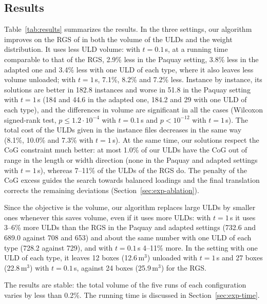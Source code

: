 \subsection{Results}
\label{sec:exp-results}

Table~\ref{tab:results} summarizes the results. In the three settings, our algorithm improves on
the RGS of \citet{Hessler2025} in both the volume of the ULDs and the weight distribution. It uses
less ULD volume: with $t = 0.1$\,s, at a running time comparable
to that of the RGS, 2.9\% less in the Paquay setting, 3.8\% less in the adapted one and 3.4\% less
with one ULD of each type, where it also leaves less volume unloaded; with $t = 1$\,s, 7.1\%,
8.2\% and 7.2\% less. Instance by instance, its solutions are better in 182.8 instances and
worse in 51.8 in the Paquay setting with $t = 1$\,s (184 and 44.6 in the adapted one, 184.2 and 29
with one ULD of each type), and the differences in volume are significant in all the cases
(Wilcoxon signed-rank test, $p \le 1.2 \cdot 10^{-4}$ with $t = 0.1$\,s and $p < 10^{-12}$ with
$t = 1$\,s). The total cost of the ULDs given in the instance files decreases in the same way
(8.1\%, 10.0\% and 7.3\% with $t = 1$\,s). At the same time, our solutions respect the CoG
constraint much better: at most 1.0\% of our ULDs have the CoG out of range in the length or width
direction (none in the Paquay and adapted settings with $t = 1$\,s), whereas 7--11\% of the ULDs
of the RGS do. The penalty of the CoG excess guides the search towards balanced loadings and the
final translation corrects the remaining deviations (Section~\ref{sec:exp-ablation}).

Since the objective is the volume, our algorithm replaces large ULDs by smaller ones whenever
this saves volume, even if it uses more ULDs: with $t = 1$\,s it uses 3--6\% more ULDs than the
RGS in the Paquay and adapted settings (732.6 and 689.0 against 708 and 653) and about the same
number with one ULD of each type (728.2 against 729), and with $t = 0.1$\,s 4--11\% more. In the
setting with one ULD of each type, it leaves 12 boxes (12.6\,m$^3$) unloaded with $t = 1$\,s and
27 boxes (22.8\,m$^3$) with $t = 0.1$\,s, against 24 boxes (25.9\,m$^3$) for the RGS.

The results are stable: the total volume of the five runs of each configuration varies by less
than 0.2\%. The running time is discussed in Section~\ref{sec:exp-time}.

